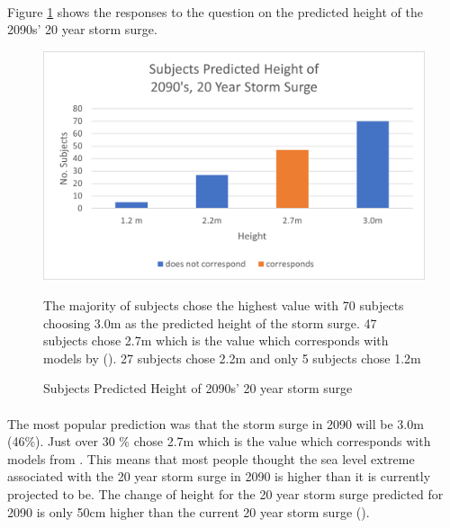 \paragraph{}

Figure \ref{fig:2090-stormsurge-answers} shows the responses to the question on the predicted height of the 2090s' 20 year storm surge.

\begin{figure}[H]
    \centering
    \includegraphics{fig_results/2090s 20yr ss answers.png}
    \caption{Subjects Predicted Height of 2090s' 20 year storm surge}{ The majority of subjects chose the highest value with 70 subjects choosing 3.0m as the predicted height of the storm surge. 47 subjects chose 2.7m which is the value which corresponds with models by (\cite{kartverket_se_2021}). 27 subjects chose 2.2m and only 5 subjects chose 1.2m}
    \label{fig:2090-stormsurge-answers}
\end{figure}
\paragraph{}
The most popular prediction was that the storm surge in 2090 will be 3.0m (46\%). Just over 30 \% chose 2.7m which is the value which corresponds with models from \cite{kartverket_se_2021}. This means that most people thought the sea level extreme associated with the 20 year storm surge in 2090 is higher than it is currently projected to be. The change of height for the 20 year storm surge predicted for 2090 is only 50cm higher than the current 20 year storm surge (\cite{kartverket_se_2021}). 
\paragraph{}

